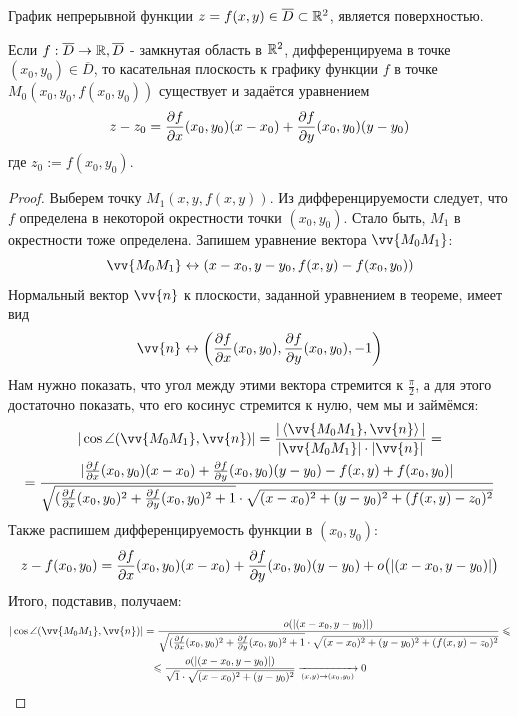 \begin{note}
	График непрерывной функции $z = f(x,y) \in \overline{D} \subset \mathbb{R}^2 $, является поверхностью.
\end{note}


\begin{theorem}
	Если $f:\overline{D}\to\mathbb{R}, \overline{D}$ - замкнутая область в $\mathbb{R}^2$, дифференцируема в точке $(x_0, y_0) \in \overline{D}$, то касательная плоскость к графику функции $f$ в точке $M_0(x_0, y_0, f(x_0, y_0))$ существует и задаётся уравнением
	\[
		z - z_0 = \frac{\partial f}{\partial x} (x_0, y_0) (x - x_0) + \frac{\partial f}{\partial y} (x_0, y_0) (y - y_0)
	\]
	где $z_0:=f(x_0,y_0)$.
\end{theorem}

\begin{proof}
	Выберем точку $M_1(x, y, f(x, y))$. Из дифференцируемости следует, что $f$ определена в некоторой окрестности точки $(x_0, y_0)$. Стало быть, $M_1$ в окрестности тоже определена. Запишем уравнение вектора $\vv{M_0 M_1}$:
	\[
		\vv{M_0M_1} \leftrightarrow (x - x_0, y - y_0, f(x, y) - f(x_0, y_0))
	\]
	Нормальный вектор $\vv{n}$ к плоскости, заданной уравнением в теореме, имеет вид
	\[
		\vv{n} \leftrightarrow \left(\pd{f}{x} (x_0, y_0), \pd{f}{y} (x_0, y_0), -1\right)
	\]
	Нам нужно показать, что угол между этими вектора стремится к $\frac{\pi}{2}$, а для этого достаточно показать, что его косинус стремится к нулю, чем мы и займёмся:
	\begin{multline*}
		|\cos \angle (\vv{M_0M_1}, \vv{n})| = \frac{|\trbr{\vv{M_0M_1},\vv{n}}|}{|\vv{M_0M_1}|\cdot |\vv{n}|} = \\ = \frac{|\pd{f}{x} (x_0, y_0)(x - x_0) + \pd{f}{y} (x_0, y_0)(y - y_0) - f(x, y) + f(x_0, y_0)|}{\sqrt{(\pd{f}{x} (x_0, y_0)^2+ \pd{f}{y} (x_0, y_0)^2+1}\cdot \sqrt{(x-x_0)^2 + (y-y_0)^2 + (f(x,y)-z_0)^2}}
	\end{multline*}
	Также распишем дифференцируемость функции в $(x_0, y_0)$:
	\[
		z - f(x_0, y_0) = \frac{\partial f}{\partial x}(x_0, y_0)(x - x_0) + \frac{\partial f}{\partial y}(x_0, y_0)(y - y_0) + o\big(|(x - x_0, y - y_0)|\big)
	\]
	Итого, подставив, получаем:
	\begin{multline*}
		|\cos \angle (\vv{M_0M_1}, \vv{n})| = \frac{o(|(x - x_0, y - y_0)|)}{\sqrt{(\pd{f}{x} (x_0, y_0)^2+ \pd{f}{y} (x_0, y_0)^2+1}\cdot \sqrt{(x-x_0)^2 + (y-y_0)^2 + (f(x,y)-z_0)^2}} \leq \\ \leq  \frac{o(|(x - x_0, y - y_0)|)}{\sqrt{1} \cdot \sqrt{(x - x_0)^2 + (y - y_0)^2}} \xrightarrow[(x, y) \to (x_0, y_0)]{} 0
	\end{multline*}
\end{proof}

